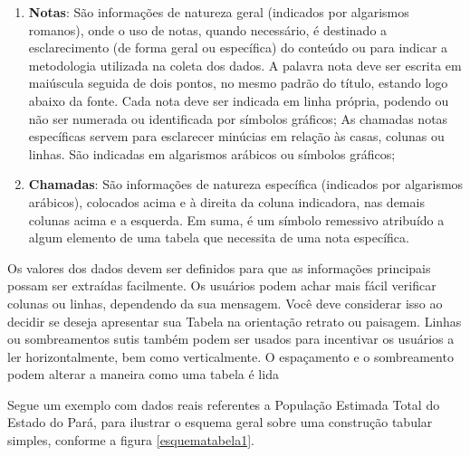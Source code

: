 \begin{enumerate}
  \item \textbf{Notas}: São informações de natureza geral (indicados por algarismos romanos), onde o uso de notas, quando necessário, é destinado a esclarecimento (de forma geral ou específica) do conteúdo ou para indicar a metodologia utilizada na coleta dos dados. A palavra nota deve ser escrita em maiúscula seguida de dois pontos, no mesmo padrão do título, estando logo abaixo da fonte. Cada nota deve ser indicada em linha própria, podendo ou não ser numerada ou identificada por símbolos gráficos; As chamadas notas específicas servem para esclarecer minúcias em relação às casas, colunas ou linhas. São indicadas em algarismos arábicos ou símbolos gráficos;
  \item \textbf{Chamadas}: São informações de natureza específica (indicados por algarismos arábicos), colocados acima
  e à direita da coluna indicadora, nas demais colunas acima e a esquerda.
  Em suma, é um símbolo remessivo atribuído a algum elemento de uma tabela
  que necessita de uma nota específica.
\end{enumerate}






\newpage
Os valores dos dados devem ser definidos para que as informações principais possam ser extraídas facilmente. Os usuários podem achar mais fácil verificar colunas ou linhas, dependendo da sua mensagem. Você deve considerar isso ao decidir se deseja apresentar sua Tabela na orientação retrato ou paisagem. Linhas ou sombreamentos sutis também podem ser usados para incentivar os usuários a ler horizontalmente, bem como verticalmente. O espaçamento e o sombreamento podem alterar a maneira como uma tabela é lida \vskip0.3cm



Segue um exemplo com dados reais referentes a População Estimada Total do Estado do Pará, para ilustrar o esquema geral sobre uma construção tabular simples, conforme a figura \ref{esquematabela1}.




